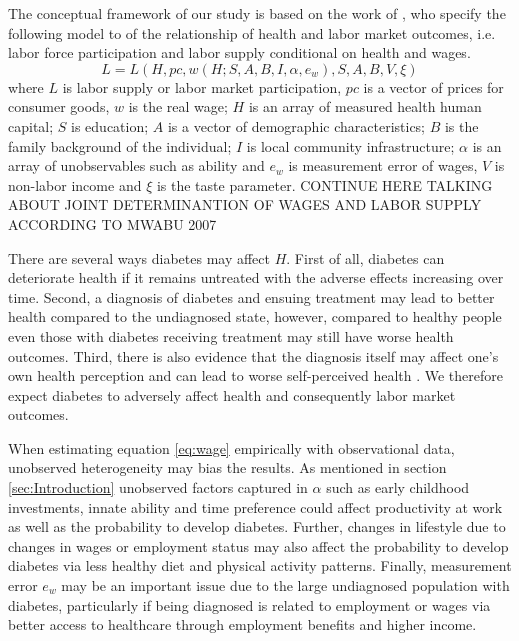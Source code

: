 \documentclass[12pt,english,british]{article}
\begin{document}
  
The conceptual framework of our study is based on the work of \citet{Strauss1998},  who specify the following model to of the relationship of health and labor market outcomes, i.e. labor force participation and labor supply conditional on health and wages.
\begin{equation}
L=L(H, pc, w(H;S,A,B,I,\alpha,e_{w}), S, A, B, V, \xi) \label{eq:wage}
\end{equation}
where $L$ is labor supply or labor market participation, $pc$ is a vector of prices for consumer goods, $w$ is the real wage; $H$ is an array of measured health human capital; $S$ is education; $A$ is a vector of demographic characteristics; $B$ is the family background of the individual; $I$ is local community infrastructure; $\alpha$ is an array of unobservables such as ability and $e_w$ is measurement error of wages, $V$ is non-labor income and $\xi$ is the taste parameter. 
CONTINUE HERE TALKING ABOUT JOINT DETERMINANTION OF WAGES AND LABOR SUPPLY ACCORDING TO MWABU 2007

There are several ways diabetes may affect $H$. First of all, diabetes can deteriorate health if it remains untreated with the adverse effects increasing over time. Second, a diagnosis of diabetes and ensuing treatment may lead to better health compared to the undiagnosed state, however, compared to healthy people even those with diabetes receiving treatment may still have worse health outcomes. Third, there is also evidence that the diagnosis itself may affect one's own health perception and can lead to worse self-perceived health \citep{17003303}. We therefore expect diabetes to adversely affect health and consequently labor market outcomes.

When estimating equation  \ref{eq:wage} empirically with observational data, unobserved heterogeneity may bias the results. As mentioned in section  \ref{sec:Introduction} unobserved factors captured in $\alpha$ such as early childhood investments, innate ability and time preference could affect productivity at work as well as the probability to develop diabetes. Further, changes in lifestyle due to changes in wages or employment status may also affect the probability to develop diabetes via  less healthy diet and physical activity patterns. Finally, measurement error $e_w$ may be an important issue due to the large undiagnosed population with diabetes, particularly if being diagnosed is related to employment or wages via better access to healthcare through employment benefits and higher income.
\end{document}
